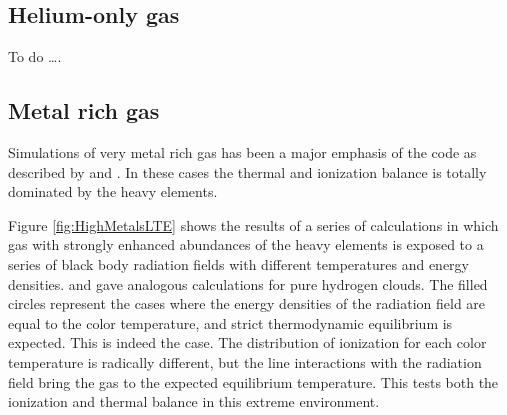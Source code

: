 \subsection{Helium-only gas}

To do \dots.

\subsection{Metal rich gas}

Simulations of very metal rich gas has been a major emphasis of the code
as described by \citep{Hamann1993} and
\citep{Ferland1996}.  In these cases the thermal
and ionization balance is totally dominated by the heavy elements.

Figure \ref{fig:HighMetalsLTE} shows the results of a series of calculations in which gas with
strongly enhanced abundances of the heavy elements is exposed to a series
of black body radiation fields with different temperatures and energy
densities.   \citep{Ferland1988} and \citep{Ferland1989} gave
analogous calculations for pure hydrogen clouds.  The filled circles
represent the cases where the energy densities of the radiation field are
equal to the color temperature, and strict thermodynamic equilibrium is
expected.  This is indeed the case.  The distribution of ionization for
each color temperature is radically different, but the line interactions
with the radiation field bring the gas to the expected equilibrium
temperature.  This tests both the ionization and thermal balance in this
extreme environment.


